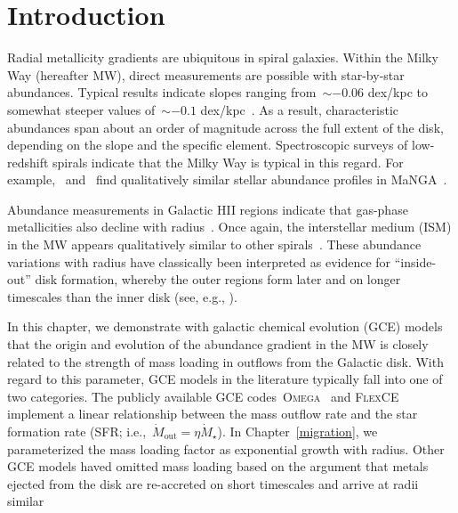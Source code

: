 \section{Introduction}
\label{outflows:sec:intro}
Radial metallicity gradients are ubiquitous in spiral galaxies.
Within the Milky Way (hereafter MW), direct measurements are possible with
star-by-star abundances.
Typical results indicate slopes ranging from~$\sim$$-0.06$ dex/kpc to somewhat
steeper values of~$\sim$$-0.1$ dex/kpc~\citep[e.g.,][]{Nordstroem2004,
Cheng2012, Frinchaboy2013, Hayden2014, Weinberg2019, Myers2022}.
As a result, characteristic abundances span about an order of magnitude across
the full extent of the disk, depending on the slope and the specific element.
Spectroscopic surveys of low-redshift spirals indicate that the Milky Way is
typical in this regard.
For example,~\citet{Goddard2017} and~\citet{Parikh2021} find qualitatively
similar stellar abundance profiles in MaNGA~\citep{Bundy2015}.
\par
Abundance measurements in Galactic HII regions indicate that gas-phase
metallicities also decline with radius~\citep[e.g.,][]{Simpson1995,
Afflerbach1997, Esteban2022, MendezDelgado2022, MendezDelgado2023}.
Once again, the interstellar medium (ISM) in the MW appears qualitatively
similar to other spirals~\citep[e.g.,][]{Belfiore2017, Berg2020,
Franchetto2021, Lutz2021, Boardman2022}.
These abundance variations with radius have classically been interpreted as
evidence for ``inside-out'' disk formation, whereby the outer regions form
later and on longer timescales than the inner disk (see, e.g.,
\citealt{Kauffmann1996}).
\par
In this chapter, we demonstrate with galactic chemical evolution (GCE) models
that the origin and evolution of the abundance gradient in the MW is closely
related to the strength of mass loading in outflows from the Galactic disk.
With regard to this parameter, GCE models in the literature typically fall into
one of two categories.
The publicly available GCE codes~\textsc{Omega}~\citep{Cote2017} and
\textsc{FlexCE}~\citep{Andrews2017} implement a linear relationship between the
mass outflow rate and the star formation rate (SFR;
i.e.,~$\dot{M}_\text{out} = \eta \dot{M}_\star$).
In Chapter~\ref{migration}, we parameterized the mass loading factor as
exponential growth with radius. 
Other GCE models haved omitted mass loading
\citep[i.e.,~$\eta = 0$; e.g.,][]{Minchev2013, Minchev2014, Spitoni2019,
Spitoni2020, Spitoni2021} based on the argument that metals ejected
from the disk are re-accreted on short timescales and arrive at radii similar
